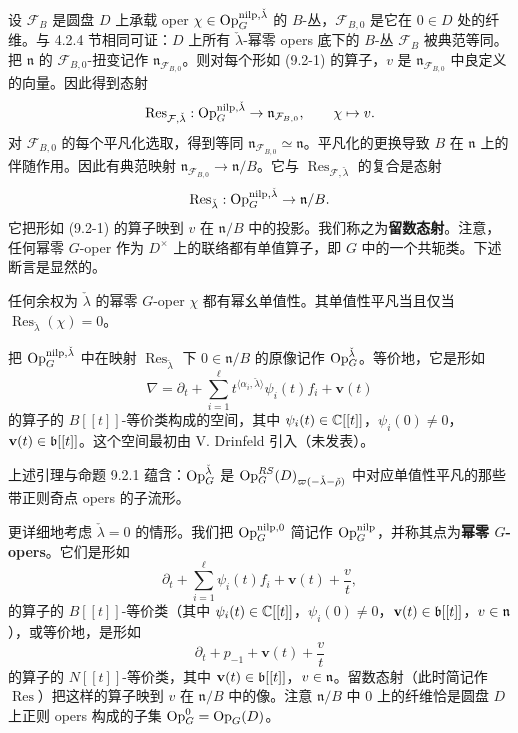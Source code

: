设 $\mathcal{F}_B$ 是圆盘 $D$ 上承载 oper $\chi\in\operatorname{Op}^{\mathrm{nilp},\check\lambda}_G$ 的 $B$-丛，$\mathcal{F}_{B,0}$ 是它在 $0\in D$ 处的纤维。与 4.2.4 节相同可证：$D$ 上所有 $\check\lambda$-幂零 opers 底下的 $B$-丛 $\mathcal{F}_B$ 被典范等同。把 $\mathfrak{n}$ 的 $\mathcal{F}_{B,0}$-扭变记作 $\mathfrak{n}_{\mathcal{F}_{B,0}}$。则对每个形如 (9.2-1) 的算子，$v$ 是 $\mathfrak{n}_{\mathcal{F}_{B,0}}$ 中良定义的向量。因此得到态射
\[
\operatorname{Res}_{\mathcal{F},\check\lambda}: \operatorname{Op}^{\mathrm{nilp},\check\lambda}_G\to\mathfrak{n}_{\mathcal{F}_{B,0}},\qquad \chi\mapsto v.
\]
对 $\mathcal{F}_{B,0}$ 的每个平凡化选取，得到等同 $\mathfrak{n}_{\mathcal{F}_{B,0}}\simeq\mathfrak{n}$。平凡化的更换导致 $B$ 在 $\mathfrak{n}$ 上的伴随作用。因此有典范映射 $\mathfrak{n}_{\mathcal{F}_{B,0}}\to\mathfrak{n}/B$。它与 $\operatorname{Res}_{\mathcal{F},\check\lambda}$ 的复合是态射
\[
\operatorname{Res}_{\check\lambda}: \operatorname{Op}^{\mathrm{nilp},\check\lambda}_G\to\mathfrak{n}/B.
\]
它把形如 (9.2-1) 的算子映到 $v$ 在 $\mathfrak{n}/B$ 中的投影。我们称之为\textbf{留数态射}。注意，任何幂零 $G$-oper 作为 $D^\times$ 上的联络都有单值算子，即 $G$ 中的一个共轭类。下述断言是显然的。

\begin{lemma}
任何余权为 $\check\lambda$ 的幂零 $G$-oper $\chi$ 都有幂幺单值性。其单值性平凡当且仅当 $\operatorname{Res}_{\check\lambda}(\chi)=0$。
\end{lemma}

把 $\operatorname{Op}^{\mathrm{nilp},\check\lambda}_G$ 中在映射 $\operatorname{Res}_{\check\lambda}$ 下 $0\in\mathfrak{n}/B$ 的原像记作 $\operatorname{Op}^{\check\lambda}_G$。等价地，它是形如
\begin{equation}
\nabla = \partial_t + \sum_{i=1}^{\ell}t^{\langle\alpha_i,\check\lambda\rangle}\psi_i(t)f_i + \mathbf{v}(t)
\tag{9.2-10}
\end{equation}
的算子的 $B[[t]]$-等价类构成的空间，其中 $\psi_i(t)\in\mathbb{C}[[t]]$，$\psi_i(0)\ne 0$，$\mathbf{v}(t)\in\mathfrak{b}[[t]]$。这个空间最初由 V. Drinfeld 引入（未发表）。

上述引理与命题 9.2.1 蕴含：$\operatorname{Op}^{\check\lambda}_G$ 是 $\operatorname{Op}^{RS}_G(D)_{\varpi(-\check\lambda-\check\rho)}$ 中对应单值性平凡的那些带正则奇点 opers 的子流形。

更详细地考虑 $\check\lambda=0$ 的情形。我们把 $\operatorname{Op}^{\mathrm{nilp},0}_G$ 简记作 $\operatorname{Op}^{\mathrm{nilp}}_G$，并称其点为\textbf{幂零 $G$-opers}。它们是形如
\begin{equation}
\partial_t + \sum_{i=1}^{\ell}\psi_i(t)f_i + \mathbf{v}(t) + \frac{v}{t},
\tag{9.2-11}
\end{equation}
的算子的 $B[[t]]$-等价类（其中 $\psi_i(t)\in\mathbb{C}[[t]]$，$\psi_i(0)\ne 0$，$\mathbf{v}(t)\in\mathfrak{b}[[t]]$，$v\in\mathfrak{n}$），或等价地，是形如
\begin{equation}
\partial_t + p_{-1} + \mathbf{v}(t) + \frac{v}{t}
\tag{9.2-12}
\end{equation}
的算子的 $N[[t]]$-等价类，其中 $\mathbf{v}(t)\in\mathfrak{b}[[t]]$，$v\in\mathfrak{n}$。留数态射（此时简记作 $\operatorname{Res}$）把这样的算子映到 $v$ 在 $\mathfrak{n}/B$ 中的像。注意 $\mathfrak{n}/B$ 中 $0$ 上的纤维恰是圆盘 $D$ 上正则 opers 构成的子集 $\operatorname{Op}^0_G = \operatorname{Op}_G(D)$。

